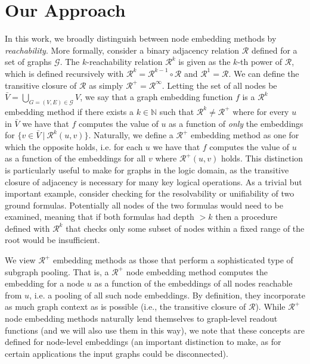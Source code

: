 \documentclass{article}
\begin{document}
 



\section{Our Approach}
\label{sec:reachability}
In this work, we broadly distinguish between node embedding methods by \textit{reachability}. More formally, consider a binary adjacency relation $\mathcal{R}$ defined for a set of graphs $\mathcal{G}$. The $k$-reachability relation $\mathcal{R}^k$ is given as the $k$-th power of $\mathcal{R}$, which is defined recursively with $\mathcal{R}^k = \mathcal{R}^{k - 1} \circ \mathcal{R}$ and $\mathcal{R}^1 = \mathcal{R}$. We can define the transitive closure of $\mathcal{R}$ as simply $\mathcal{R}^+ = \mathcal{R}^\infty$. Letting the set of all nodes be $\bar{V} = \bigcup_{G = (V, E) \in \mathcal{G}} V$, we say that a graph embedding function $f$ is a $\mathcal{R}^k$ embedding method if there exists a $k \in \mathbb{N}$ such that $\mathcal{R}^k \neq \mathcal{R}^+$ where for every $u$ in $\bar{V}$ we have that $f$ computes the value of $u$ as a function of \textit{only} the embeddings for $\{ v \in \bar{V} \ | \ \mathcal{R}^k(u, v) \}$. Naturally, we define a $\mathcal{R}^+$ embedding method as one for which the opposite holds, i.e. for each $u$ we have that $f$ computes the value of $u$ as a function of the embeddings for all $v$ where $\mathcal{R}^+(u, v)$ holds. This distinction is particularly useful to make for graphs in the logic domain, as the transitive closure of adjacency is necessary for many key logical operations. As a trivial but important example, consider checking for the resolvability or unifiability of two ground formulas. Potentially all nodes of the two formulas would need to be examined, meaning that if both formulas had depth $> k$ then a procedure defined with $\mathcal{R}^k$ that checks only some subset of nodes within a fixed range of the root would be insufficient.

We view $\mathcal{R}^+$ embedding methods as those that perform a sophisticated type of subgraph pooling. That is, a $\mathcal{R}^+$ node embedding method computes the embedding for a node $u$ as a function of the embeddings of all nodes reachable from $u$, i.e. a pooling of all such node embeddings. By definition, they incorporate as much graph context as is possible (i.e., the transitive closure of $\mathcal{R}$). While $\mathcal{R}^+$ node embedding methods naturally lend themselves to graph-level readout functions (and we will also use them in this way), we note that these concepts are defined for node-level embeddings (an important distinction to make, as for certain applications the input graphs could be disconnected).
\end{document}
